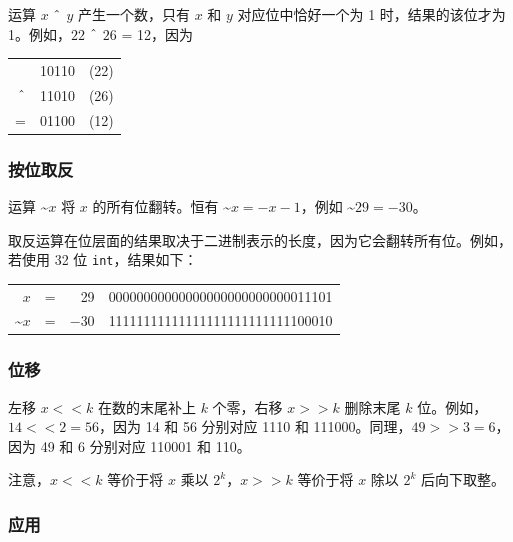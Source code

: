 
运算 $x$ $\XOR$ $y$ 产生一个数，只有 $x$ 和 $y$ 对应位中恰好一个为 1 时，结果的该位才为 1。例如，$22$ $\XOR$ $26$ = 12，因为

\begin{center}
\begin{tabular}{rrr}
& 10110 & (22)\\
$\XOR$ & 11010 & (26) \\
\hline
 = & 01100 & (12) \\
\end{tabular}
\end{center}

\subsubsection{按位取反}


运算 \textasciitilde$x$ 将 $x$ 的所有位翻转。恒有 \textasciitilde$x=-x-1$，例如 \textasciitilde$29=-30$。

取反运算在位层面的结果取决于二进制表示的长度，因为它会翻转所有位。例如，若使用 32 位 \texttt{int}，结果如下：

\begin{center}
\begin{tabular}{rrrr}
$x$ & = & 29 &   00000000000000000000000000011101 \\
\textasciitilde$x$ & = & $-30$ & 11111111111111111111111111100010 \\
\end{tabular}
\end{center}

\subsubsection{位移}


左移 $x<<k$ 在数的末尾补上 $k$ 个零，右移 $x>>k$ 删除末尾 $k$ 位。例如，$14<<2=56$，因为 14 和 56 分别对应 1110 和 111000。同理，$49>>3=6$，因为 49 和 6 分别对应 110001 和 110。

注意，$x<<k$ 等价于将 $x$ 乘以 $2^k$，$x>>k$ 等价于将 $x$ 除以 $2^k$ 后向下取整。

\subsubsection{应用}

